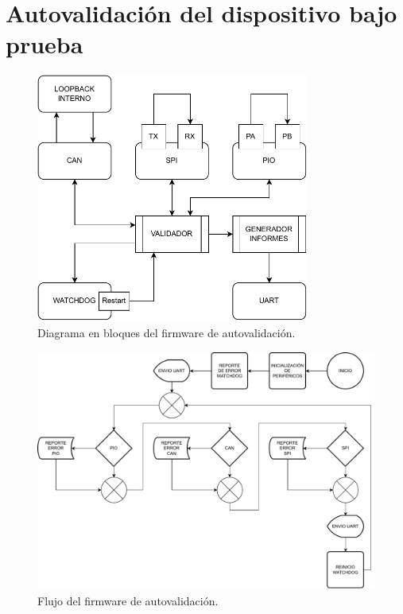 \section{Autovalidación del dispositivo bajo prueba}
\label{sec:autovalidacion}

\begin{figure}[htbp]
	\centering
	\includegraphics[width=0.8\textwidth]{./Figures/firmware_detallado.pdf}
    \caption{Diagrama en bloques del firmware de autovalidación.}
	\label{fig:firmwaredetail}
\end{figure}

\begin{figure}[htbp]
	\centering
	\includegraphics[width=\textwidth]{./Figures/firmwareflow.pdf}
    \caption{Flujo del firmware de autovalidación.}
	\label{fig:firmwareflow}
\end{figure}

